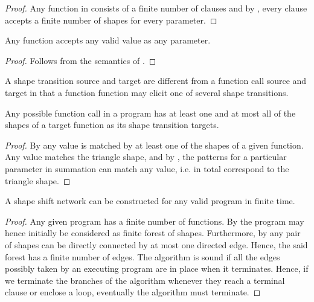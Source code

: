 \begin{proof} Any function in \D{} consists of a finite number of clauses and
by , every clause accepts a finite number of
shapes for every parameter.\end{proof}

\begin{lemma}\label{lemma:extend-any-function-any-value} Any function accepts
any valid \D{} value as any parameter.\end{lemma}

\begin{proof} Follows from the semantics of \D{}.\end{proof}

\begin{definition} A shape transition source and target are different from a
function call source and target in that a function function may elicit one of
several shape transitions.\end{definition}

\begin{lemma}\label{lemma:extend-any-call-targets} Any possible function call in a program has at least one and at
most all of the shapes of a target function as its shape transition
targets.\end{lemma}

\begin{proof} By  any value is
matched by at least one of the shapes of a given function. Any value matches
the triangle shape, and by , the
patterns for a particular parameter in summation can match any value, i.e. in
total correspond to the triangle shape.\end{proof}

\begin{theorem} A shape shift network can be constructed for any valid program
in finite time.\end{theorem}

\begin{proof} Any given program has a finite number of functions. By
 the program may hence initially be
considered as finite forest of shapes. Furthermore, by
 any pair of shapes can be directly
connected by at most one directed edge. Hence, the said forest has a finite
number of edges. The algorithm is sound if all the edges possibly taken by an
executing program are in place when it terminates.  Hence, if we terminate the
branches of the algorithm whenever they reach a terminal clause or enclose a
loop, eventually the algorithm must terminate.\end{proof}


